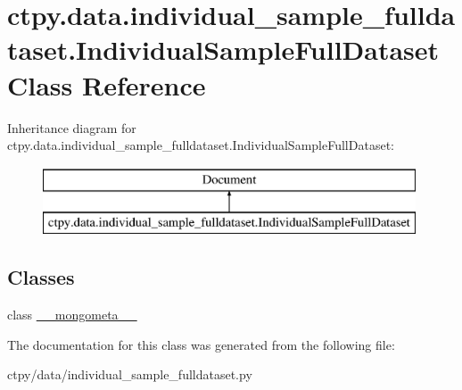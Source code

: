 \hypertarget{classctpy_1_1data_1_1individual__sample__fulldataset_1_1_individual_sample_full_dataset}{\section{ctpy.\-data.\-individual\-\_\-sample\-\_\-fulldataset.\-Individual\-Sample\-Full\-Dataset Class Reference}
\label{classctpy_1_1data_1_1individual__sample__fulldataset_1_1_individual_sample_full_dataset}
}
Inheritance diagram for ctpy.\-data.\-individual\-\_\-sample\-\_\-fulldataset.\-Individual\-Sample\-Full\-Dataset\-:\begin{figure}[H]
\begin{center}
\leavevmode
\includegraphics[height=2.000000cm]{classctpy_1_1data_1_1individual__sample__fulldataset_1_1_individual_sample_full_dataset}
\end{center}
\end{figure}
\subsection*{Classes}
\begin{DoxyCompactItemize}
\item 
class \hyperlink{classctpy_1_1data_1_1individual__sample__fulldataset_1_1_individual_sample_full_dataset_1_1____mongometa____}{\-\_\-\-\_\-mongometa\-\_\-\-\_\-}
\end{DoxyCompactItemize}


The documentation for this class was generated from the following file\-:\begin{DoxyCompactItemize}
\item 
ctpy/data/individual\-\_\-sample\-\_\-fulldataset.\-py\end{DoxyCompactItemize}
